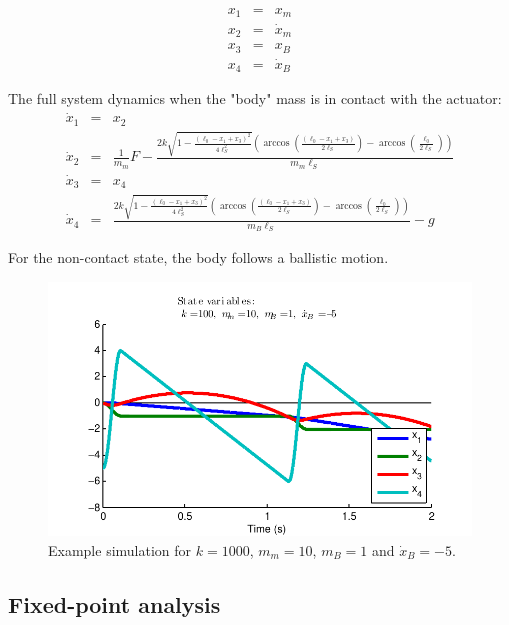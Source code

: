 \documentclass[letterpaper, 12 pt]{article}  %
\begin{document}
	\begin{eqnarray*}
	x_{1} & = & x_{m}\\
	x_{2} & = & \dot{x}_{m}\\
	x_{3} & = & x_{B}\\
	x_{4} & = & \dot{x}_{B}
	\end{eqnarray*}

The full system dynamics when the "body" mass is in contact with the actuator:
	\begin{eqnarray*}
	\dot{x}_{1} & = & x_{2}\\
	\dot{x}_{2} & = & \frac{1}{m_{m}}F-\frac{2k\sqrt{1-\frac{\left(\ell_{0}-x_{1}+x_{3}\right)^{2}}{4\ell_{S}^{2}}}\left(\arccos\left(\frac{\left(\ell_{0}-x_{1}+x_{3}\right)}{2\ell_{S}}\right)-\arccos\left(\frac{\ell_{0}}{2\ell_{S}}\right)\right)}{m_{m}\ell_{S}}\\
	\dot{x}_{3} & = & x_{4}\\
	\dot{x}_{4} & = & \frac{2k\sqrt{1-\frac{\left(\ell_{0}-x_{1}+x_{3}\right)^{2}}{4\ell_{S}^{2}}}\left(\arccos\left(\frac{\left(\ell_{0}-x_{1}+x_{3}\right)}{2\ell_{S}}\right)-\arccos\left(\frac{\ell_{0}}{2\ell_{S}}\right)\right)}{m_{B}\ell_{S}}-g
	\end{eqnarray*}

For the non-contact state, the body follows a ballistic motion.

	\begin{figure}[h]
		\centering
		\includegraphics[scale=1]{./images/sys.pdf}
		\caption{	Example simulation for $k=1000$, $m_m=10$, $m_B=1$ and $\dot{x}_B=-5$.}
		\label{fig:SEDA}
	\end{figure}

\subsection{Fixed-point analysis}
\end{document}
